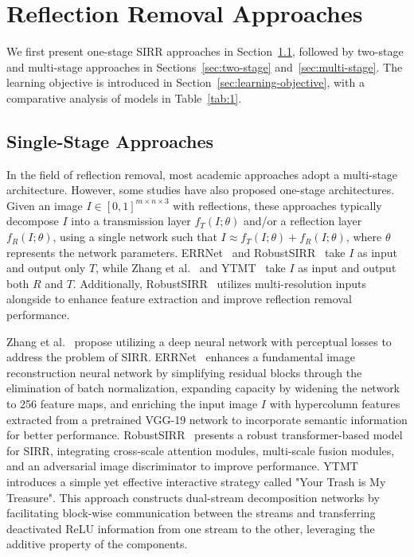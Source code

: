 

\section{Reflection Removal Approaches}
We first present one-stage SIRR approaches in Section~\ref{sec:single-stage}, followed by two-stage and multi-stage approaches in Sections~\ref{sec:two-stage} and~\ref{sec:multi-stage}. The learning objective is introduced in Section~\ref{sec:learning-objective}, with a comparative analysis of models in Table~\ref{tab:1}.

\subsection{Single-Stage Approaches}
\label{sec:single-stage}

In the field of reflection removal, most academic approaches adopt a multi-stage architecture. However, some studies have also proposed one-stage architectures. Given an image \( I \in [0, 1]^{m \times n \times 3} \) with reflections, these approaches typically decompose \( I \) into a transmission layer \( f_T(I; \theta) \) and/or a reflection layer \( f_R(I; \theta) \), using a single network such that $I \approx f_T(I; \theta) + f_R(I; \theta)$, where \( \theta \) represents the network parameters.
ERRNet~\cite{wei2019single} and RobustSIRR~\cite{song2023robust} take \( I \) as input and output only \( T \), while Zhang et al.~\cite{zhang2018single} and YTMT~\cite{hu2021trash} take \( I \) as input and output both \( R \) and \( T \). Additionally, RobustSIRR~\cite{song2023robust} utilizes multi-resolution inputs alongside to enhance feature extraction and improve reflection removal performance.

Zhang et al.~\cite{zhang2018single} propose utilizing a deep neural network with perceptual losses to address the problem of SIRR. ERRNet~\cite{wei2019single} enhances a fundamental image reconstruction neural network by simplifying residual blocks through the elimination of batch normalization, expanding capacity by widening the network to 256 feature maps, and enriching the input image \( I \)  with hypercolumn features extracted from a pretrained VGG-19 network to incorporate semantic information for better performance. RobustSIRR~\cite{song2023robust} presents a robust transformer-based model for SIRR, integrating cross-scale attention modules, multi-scale fusion modules, and an adversarial image discriminator to improve performance. YTMT~\cite{hu2021trash} introduces a simple yet effective interactive strategy called "Your Trash is My Treasure". This approach constructs dual-stream decomposition networks by facilitating block-wise communication between the streams and transferring deactivated ReLU information from one stream to the other, leveraging the additive property of the components.


